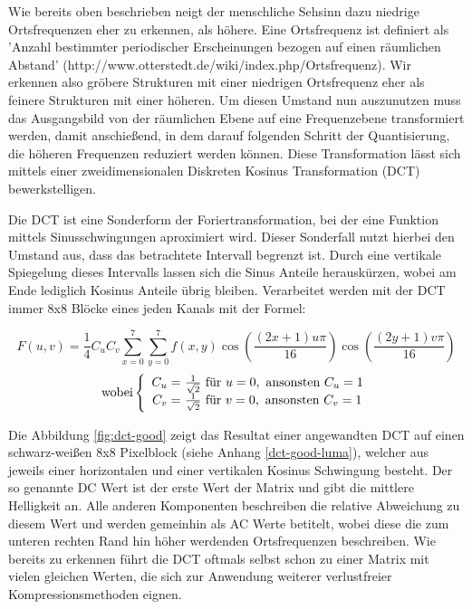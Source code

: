 
Wie bereits oben beschrieben neigt der menschliche Sehsinn dazu niedrige Ortsfrequenzen eher zu erkennen, als höhere. Eine Ortsfrequenz ist definiert als 'Anzahl bestimmter periodischer Erscheinungen bezogen auf einen räumlichen Abstand' (http://www.otterstedt.de/wiki/index.php/Ortsfrequenz). Wir erkennen also gröbere Strukturen mit einer niedrigen Ortsfrequenz eher als feinere Strukturen mit einer höheren.
Um diesen Umstand nun auszunutzen muss das Ausgangsbild von der räumlichen Ebene auf eine Frequenzebene transformiert werden, damit anschießend, in dem darauf folgenden Schritt der Quantisierung, die höheren Frequenzen reduziert werden können. Diese Transformation lässt sich mittels einer zweidimensionalen Diskreten Kosinus Transformation (DCT) bewerkstelligen.

Die DCT ist eine Sonderform der Foriertransformation, bei der eine Funktion mittels Sinusschwingungen aproximiert wird. Dieser Sonderfall nutzt hierbei den Umstand aus, dass das betrachtete Intervall begrenzt ist. Durch eine vertikale Spiegelung dieses Intervalls lassen sich die Sinus Anteile herauskürzen, wobei am Ende lediglich Kosinus Anteile übrig bleiben. %
Verarbeitet werden mit der DCT immer 8x8 Blöcke eines jeden Kanals mit der Formel:

\[ F(u,v) = \frac{1}{4} C_uC_v\sum_{x=0}^7 \sum_{y=0}^7 f(x,y) \cos \left(\frac{(2x+1)u\pi}{16}\right) \cos\left(\frac{(2y+1)v\pi}{16}\right) \]
\begin{align*}
	\text{wobei} \left\lbrace
  \begin{array}{r@{}l}
	  C_u = & \text{ } \frac{1}{\sqrt{2}} \text{ für } u=0, \text{ ansonsten } C_u=1\\
	  C_v = & \text{ } \frac{1}{\sqrt{2}} \text{ für } v=0, \text{ ansonsten } C_v=1
  \end{array}
  \right.
\end{align*}

Die Abbildung \ref{fig:dct-good} zeigt das Resultat einer angewandten DCT auf einen schwarz-weißen 8x8 Pixelblock (siehe Anhang \ref{dct-good-luma}), welcher aus jeweils einer horizontalen und einer vertikalen Kosinus Schwingung besteht. Der so genannte DC Wert ist der erste Wert der Matrix und gibt die mittlere Helligkeit an. Alle anderen Komponenten beschreiben die relative Abweichung zu diesem Wert und werden gemeinhin als AC Werte betitelt, wobei diese die zum unteren rechten Rand hin höher werdenden Ortsfrequenzen beschreiben. Wie bereits zu erkennen führt die DCT oftmals selbst schon zu einer Matrix mit vielen gleichen Werten, die sich zur Anwendung weiterer verlustfreier Kompressionsmethoden eignen.

